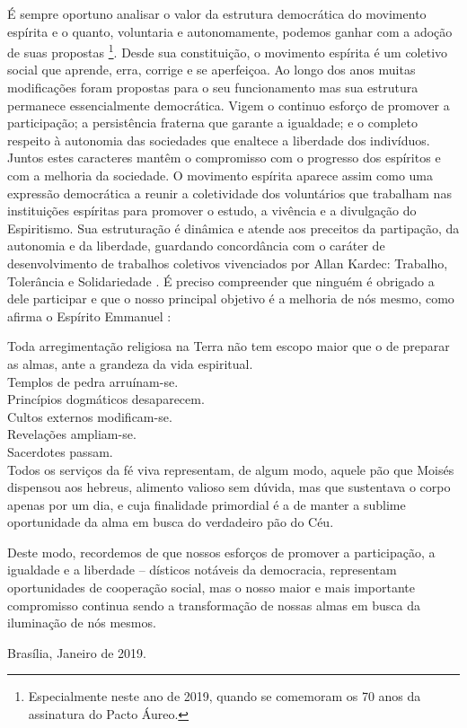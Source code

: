 É sempre oportuno analisar o valor da estrutura democrática do movimento espírita e o quanto, voluntaria e autonomamente, podemos ganhar com a adoção de suas propostas \footnote{Especialmente neste ano de 2019, quando se comemoram os 70 anos da assinatura do Pacto Áureo.}. Desde sua constituição, o movimento espírita é um coletivo social que aprende, erra, corrige e se aperfeiçoa. Ao longo dos anos muitas modificações foram propostas para o seu funcionamento mas sua estrutura permanece essencialmente democrática. Vigem o continuo esforço de promover a participação; a persistência fraterna que garante a igualdade; e o completo respeito à autonomia das sociedades que enaltece a liberdade dos indivíduos. Juntos estes caracteres mantêm o compromisso com o progresso dos espíritos e com a melhoria da sociedade. O movimento espírita aparece assim como uma expressão democrática a reunir a coletividade dos voluntários que trabalham nas instituições espíritas para promover o estudo, a vivência e a divulgação do Espiritismo. Sua estruturação é dinâmica e atende aos preceitos da partipação, da autonomia e da liberdade, guardando concordância com o caráter de desenvolvimento de trabalhos coletivos vivenciados por Allan Kardec: Trabalho, Tolerância e Solidariedade \cite[p. 14]{Kardec1890}. É preciso compreender que ninguém é obrigado a dele participar e que o nosso principal objetivo é a melhoria de nós mesmo, como afirma o Espírito Emmanuel \cite[Edição Kindle: comentário a João 6:32]{emmEvJoao}:

\begin{citacao}
Toda arregimentação religiosa na Terra não tem escopo maior que o de preparar as almas, ante a grandeza da vida espiritual.\\
Templos de pedra arruínam-se.\\
Princípios dogmáticos desaparecem.\\
Cultos externos modificam-se.\\
Revelações ampliam-se.\\
Sacerdotes passam.\\
Todos os serviços da fé viva representam, de algum modo, aquele pão que Moisés dispensou aos hebreus, alimento valioso sem dúvida, mas que sustentava o corpo apenas por um dia, e cuja finalidade primordial é a de manter a sublime oportunidade da alma em busca do verdadeiro pão do Céu.
\end{citacao}
 
 Deste modo, recordemos de que nossos esforços de promover a participação, a igualdade e a liberdade -- dísticos notáveis da democracia, representam  oportunidades de cooperação social, mas o nosso maior e mais importante compromisso continua sendo a transformação de nossas almas em busca da iluminação de nós mesmos.

\vspace{1,2cm}
\hspace{\fill} Brasília, Janeiro de 2019.